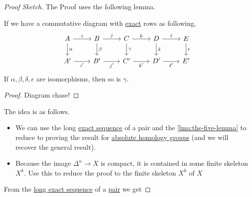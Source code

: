 \begin{proof}[Proof Sketch]
	The Proof uses the following lemma.
	\begin{lemma}\label{lma:the-five-lemma}
		If we have a commutative diagram with \hyperref[def:exact]{exact} rows as following,
		\[
			\begin{tikzcd}
				A & B & C & D & E \\
				{A^\prime} & {B^\prime} & {C^\prime} & {D^\prime} & {E^\prime}
				\arrow["\alpha", from=1-1, to=2-1]
				\arrow["\gamma", from=1-3, to=2-3]
				\arrow["\delta", from=1-4, to=2-4]
				\arrow["\epsilon", from=1-5, to=2-5]
				\arrow["{i^\prime}"', from=2-1, to=2-2]
				\arrow["\beta", from=1-2, to=2-2]
				\arrow["{j^\prime}"', from=2-2, to=2-3]
				\arrow["{k^\prime}"', from=2-3, to=2-4]
				\arrow["{\ell^\prime}"', from=2-4, to=2-5]
				\arrow["\ell", from=1-4, to=1-5]
				\arrow["k", from=1-3, to=1-4]
				\arrow["j", from=1-2, to=1-3]
				\arrow["i", from=1-1, to=1-2]
			\end{tikzcd}
		\]
		If $\alpha, \beta, \delta, \epsilon$ are isomorphisms, then so is $\gamma$.
	\end{lemma}
	\begin{proof}
		Diagram chase!
	\end{proof}

	The idea is as follows.
	\begin{itemize}
		\item We can use the long \hyperref[def:exact-sequence]{exact sequence} of a pair and the \autoref{lma:the-five-lemma} to reduce to proving the result for
		      \hyperref[def:homology-group]{absolute homology groups} (and we will recover the general result).
		\item Because the image $\Delta^n \to X$ is compact, it is contained in some finite skeleton $X^k$. Use this to reduce the proof to the finite skeleton $X^k$ of $X$
	\end{itemize}
	From the \hyperref[def:exact-sequence]{long exact sequence} of a \hyperref[def:good-pair]{pair} we get
	\par


\end{proof}

